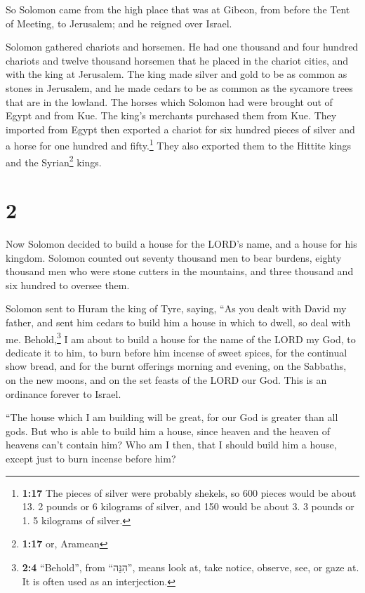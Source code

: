  So Solomon came from the high place that was at Gibeon,
from before the Tent of Meeting, to Jerusalem; and he reigned over
Israel.

 Solomon gathered chariots and horsemen. He had one
thousand and four hundred chariots and twelve thousand horsemen that he
placed in the chariot cities, and with the king at Jerusalem.
 The king made silver and gold to be as common as stones
in Jerusalem, and he made cedars to be as common as the sycamore trees
that are in the lowland.  The horses which Solomon had
were brought out of Egypt and from Kue. The king's merchants purchased
them from Kue.  They imported from Egypt then exported a
chariot for six hundred pieces of silver and a horse for one hundred and
fifty.\footnote{\textbf{1:17} The pieces of silver were probably
  shekels, so 600 pieces would be about 13. 2 pounds or 6 kilograms of
  silver, and 150 would be about 3. 3 pounds or 1. 5 kilograms of
  silver.} They also exported them to the Hittite kings and the
Syrian\footnote{\textbf{1:17} or, Aramean} kings.

\hypertarget{section-1}{%
\section{2}\label{section-1}}

 Now Solomon decided to build a house for the LORD's name,
and a house for his kingdom.  Solomon counted out seventy
thousand men to bear burdens, eighty thousand men who were stone cutters
in the mountains, and three thousand and six hundred to oversee them.

 Solomon sent to Huram the king of Tyre, saying, ``As you
dealt with David my father, and sent him cedars to build him a house in
which to dwell, so deal with me.  Behold,\footnote{\textbf{2:4}
  ``Behold'', from ``הִנֵּה'', means look at, take notice, observe, see,
  or gaze at. It is often used as an interjection.} I am about to build
a house for the name of the LORD my God, to dedicate it to him, to burn
before him incense of sweet spices, for the continual show bread, and
for the burnt offerings morning and evening, on the Sabbaths, on the new
moons, and on the set feasts of the LORD our God. This is an ordinance
forever to Israel.

 ``The house which I am building will be great, for our
God is greater than all gods.  But who is able to build
him a house, since heaven and the heaven of heavens can't contain him?
Who am I then, that I should build him a house, except just to burn
incense before him?

